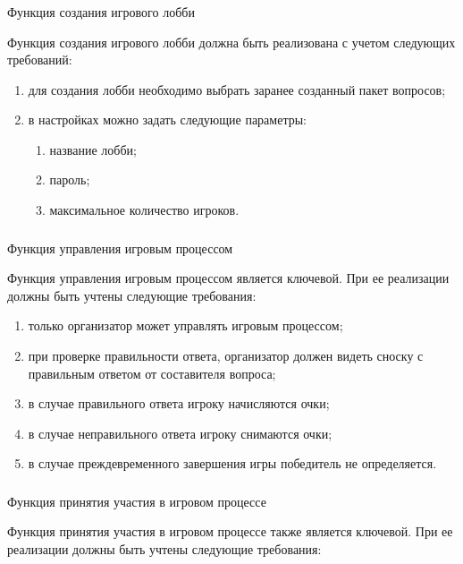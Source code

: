 \subsubsection{} Функция создания игрового лобби
\label{sec:domain:specification:create_lobby}

Функция создания игрового лобби должна быть реализована с учетом следующих требований:

\begin{enumerate}
	\item для создания лобби необходимо выбрать заранее созданный пакет вопросов;
	\item в настройках можно задать следующие параметры:
	\begin{enumerate}
		\item название лобби;
		\item пароль;
		\item максимальное количество игроков.
	\end{enumerate}
\end{enumerate}

\subsubsection{} Функция управления игровым процессом
\label{sec:domain:specification:control}

Функция управления игровым процессом является ключевой. При ее реализации должны быть учтены следующие требования:

\begin{enumerate}
	\item только организатор может управлять игровым процессом;
	\item при проверке правильности ответа, организатор должен видеть сноску с правильным ответом от составителя вопроса;
	\item в случае правильного ответа игроку начисляются очки;
	\item в случае неправильного ответа игроку снимаются очки;
	\item в случае преждевременного завершения игры победитель не определяется.
\end{enumerate}

\subsubsection{} Функция принятия участия в игровом процессе
\label{sec:domain:specification:play}

Функция принятия участия в игровом процессе также является ключевой. При ее реализации должны быть учтены следующие требования:

